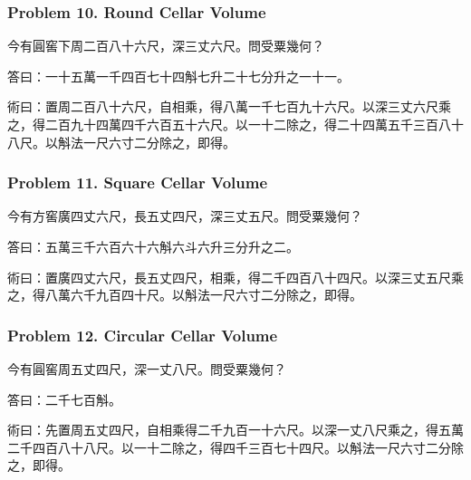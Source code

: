\documentclass[11pt,a4paper]{article}
\newcommand{\zh}[1]{{\CJKfamily{}#1}}
\begin{document}
\subsubsection*{Problem 10. Round Cellar Volume}

\begin{problembox}[title=\zh{問}]
\zh{今有圓窖下周二百八十六尺，深三丈六尺。問受粟幾何？}
\end{problembox}
\begin{answerbox}[title=\zh{答}]
\zh{答曰：一十五萬一千四百七十四斛七升二十七分升之一十一。}
\end{answerbox}
\begin{methodbox}[title=\zh{術}]
\zh{術曰：置周二百八十六尺，自相乘，得八萬一千七百九十六尺。以深三丈六尺乘之，得二百九十四萬四千六百五十六尺。以一十二除之，得二十四萬五千三百八十八尺。以斛法一尺六寸二分除之，即得。}
\end{methodbox}

\subsubsection*{Problem 11. Square Cellar Volume}

\begin{problembox}[title=\zh{問}]
\zh{今有方窖廣四丈六尺，長五丈四尺，深三丈五尺。問受粟幾何？}
\end{problembox}
\begin{answerbox}[title=\zh{答}]
\zh{答曰：五萬三千六百六十六斛六斗六升三分升之二。}
\end{answerbox}
\begin{methodbox}[title=\zh{術}]
\zh{術曰：置廣四丈六尺，長五丈四尺，相乘，得二千四百八十四尺。以深三丈五尺乘之，得八萬六千九百四十尺。以斛法一尺六寸二分除之，即得。}
\end{methodbox}

\subsubsection*{Problem 12. Circular Cellar Volume}

\begin{problembox}[title=\zh{問}]
\zh{今有圓窖周五丈四尺，深一丈八尺。問受粟幾何？}
\end{problembox}
\begin{answerbox}[title=\zh{答}]
\zh{答曰：二千七百斛。}
\end{answerbox}
\begin{methodbox}[title=\zh{術}]
\zh{術曰：先置周五丈四尺，自相乘得二千九百一十六尺。以深一丈八尺乘之，得五萬二千四百八十八尺。以一十二除之，得四千三百七十四尺。以斛法一尺六寸二分除之，即得。}
\end{methodbox}
\end{document}
